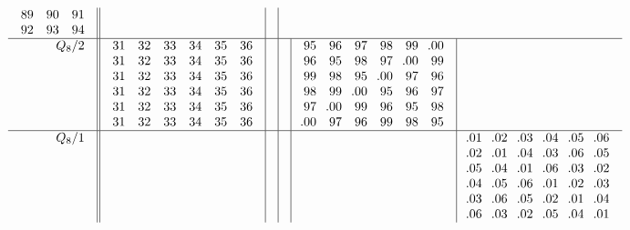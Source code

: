 \documentclass[11pt,a4paper]{amsart}
\begin{document}
\begin{align*}
\begin{array}{r||c|c|c|c|c}
\begin{array}{ccc}
      89&90&91\\
      92&93&94\\
    \end{array}
&& \\ \hline
    \begin{array}{r}
      Q_8/2 \\ \\ \\ \\ \\ \\
    \end{array}
&
  \begin{array}{cccccc}
31&32&33&34&35&36\\
31&32&33&34&35&36\\
31&32&33&34&35&36\\
31&32&33&34&35&36\\
31&32&33&34&35&36\\
31&32&33&34&35&36\\
  \end{array}
&&&
  \begin{array}{cccccc}
95&96&97&98&99&\llap.00\\
96&95&98&97&\llap.00&99\\
99&98&95&\llap.00&97&96\\
98&99&\llap.00&95&96&97\\
97&\llap.00&99&96&95&98\\
\llap.00&97&96&99&98&95\\
  \end{array}
& \\ \hline
    \begin{array}{r}
      Q_8/1 \\ \\ \\ \\ \\ \\
    \end{array}
&&&&&
      \begin{array}{cccccc}
\llap.01&\llap.02&\llap.03&\llap.04&\llap.05&\llap.06\\
\llap.02&\llap.01&\llap.04&\llap.03&\llap.06&\llap.05\\
\llap.05&\llap.04&\llap.01&\llap.06&\llap.03&\llap.02\\
\llap.04&\llap.05&\llap.06&\llap.01&\llap.02&\llap.03\\
\llap.03&\llap.06&\llap.05&\llap.02&\llap.01&\llap.04\\
\llap.06&\llap.03&\llap.02&\llap.05&\llap.04&\llap.01\\
      \end{array}
  \end{array}
\end{align*}
\end{document}
